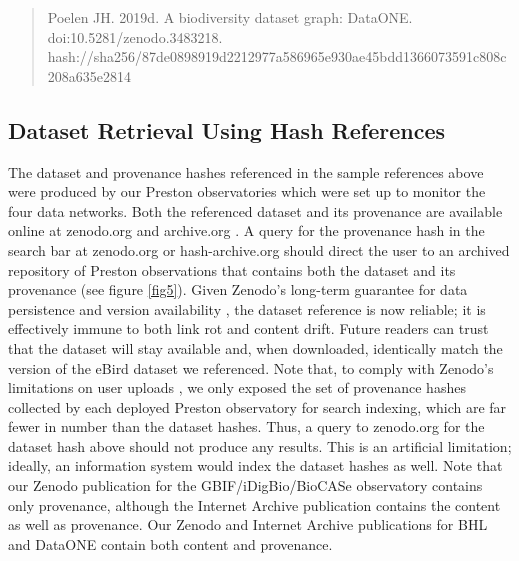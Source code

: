 \begin{quote}
Poelen JH. 2019d. A biodiversity dataset graph: DataONE.
doi:10.5281/zenodo.3483218. hash://sha256/87de0898919d2212977a586965e930ae45bdd1366073591c808c208a635e2814
\end{quote}

\subsection*{Dataset Retrieval Using Hash References}
The dataset and provenance hashes referenced in the sample references above were produced by our Preston observatories which were set up to monitor the four data networks. Both the referenced dataset and its provenance are available online at zenodo.org \citep{poelen_jorrit_h_2019_3483218, poelen_jorrit_h_2019_3484555, poelen_jorrit_h_2019_3484205} and archive.org \citep{poelen_jorrit_h_2019_archive_org}. A query for the provenance hash in the search bar at zenodo.org or hash-archive.org should direct the user to an archived repository of Preston observations that contains both the dataset and its provenance (see figure \ref{fig5}). Given Zenodo's long-term guarantee for data persistence and version availability \citep{zenodo_2019}, the dataset reference is now reliable; it is effectively immune to both link rot and content drift. Future readers can trust that the dataset will stay available and, when downloaded, identically match the version of the eBird dataset we referenced. Note that, to comply with Zenodo's limitations on user uploads \citep{zenodo_2019}, we only exposed the set of provenance hashes collected by each deployed Preston observatory for search indexing, which are far fewer in number than the dataset hashes. Thus, a query to zenodo.org for the dataset hash above should not produce any results. This is an artificial limitation; ideally, an information system would index the dataset hashes as well. Note that our Zenodo publication for the GBIF/iDigBio/BioCASe observatory \citep{poelen_jorrit_h_2019_3484205} contains only provenance, although the Internet Archive publication \citep{poelen_jorrit_h_2019_archive_org} contains the content as well as provenance. Our Zenodo and Internet Archive publications for BHL \citep{poelen_jorrit_h_2019_3484555, poelen_jorrit_h_2019_archive_org_bhl} and DataONE \citep{poelen_jorrit_h_2019_3483218,poelen_jorrit_h_2019_archive_org_dataone} contain both content and provenance.

